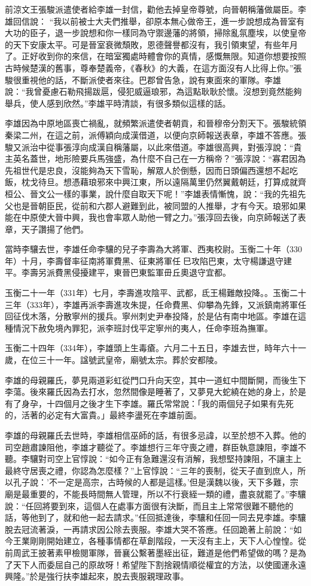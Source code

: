 前涼文王張駿派遣使者給李雄一封信，勸他去掉皇帝尊號，向晉朝稱藩做屬臣。李雄回信說： “我以前被士大夫們推舉，卻原本無心做帝王，進一步說想成為晉室有大功的臣子，退一步說想和你一樣同為守禦邊藩的將領，掃除亂氛塵埃，以使皇帝的天下安康太平。可是晉室衰微頹敗，恩德聲譽都沒有，我引領東望，有些年月了。正好收到你的來信，在暗室獨處時體會你的真情，感慨無限。知道你想要按照古時候楚漢的舊事，尊奉楚義帝，《春秋》的大義，在這方面沒有人比得上你。”張駿很重視他的話，不斷派使者來往。巴郡曾告急，說有東面來的軍隊。李雄說：“我曾憂慮石勒飛揚跋扈，侵犯威逼琅邪，為這點耿耿於懷。沒想到竟然能夠舉兵，使人感到欣然。”李雄平時清談，有很多類似這樣的話。

李雄因為中原地區喪亡禍亂，就頻繁派遣使者朝貢，和晉穆帝分割天下。張駿統領秦梁二州，在這之前，派傅穎向成漢借道，以便向京師報送表章，李雄不答應。張駿又派治中從事張淳向成漢自稱藩屬，以此來借道。李雄很高興，對張淳說：“貴主英名蓋世，地形險要兵馬強盛，為什麼不自己在一方稱帝？”張淳說：“寡君因為先祖世代是忠良，沒能夠為天下雪恥，解眾人於倒懸，因而日頭偏西還想不起吃飯，枕戈待旦。想憑藉琅邪來中興江東，所以遠隔萬里仍然翼戴朝廷，打算成就齊桓公、晉文公一樣的事業，說什麼自取天下呢！”李雄表情慚愧，說：“我的先祖先父也是晉朝臣民，從前和六郡人避難到此，被同盟的人推舉，才有今天。琅邪如果能在中原使大晉中興，我也會率眾人助他一臂之力。”張淳回去後，向京師報送了表章，天子讚揚了他們。

當時李驤去世，李雄任命李驤的兒子李壽為大將軍、西夷校尉。玉衡二十年（330年）十月，李壽督率征南將軍費黑、征東將軍任巳攻陷巴東，太守楊謙退守建平。李壽另派費黑侵擾建平，東晉巴東監軍毌丘奧退守宜都。

玉衡二十一年（331年）七月，李壽進攻陰平、武都，氐王楊難敵投降。。玉衡二十三年（333年），李雄再派李壽進攻朱提，任命費黑、仰攀為先鋒，又派鎮南將軍任回征伐木落，分散寧州的援兵。寧州刺史尹奉投降，於是佔有南中地區。李雄在這種情況下赦免境內罪犯，派李班討伐平定寧州的夷人，任命李班為撫軍。

玉衡二十四年（334年），李雄頭上生毒瘡。六月二十五日，李雄去世，時年六十一歲，在位三十一年。諡號武皇帝，廟號太宗。葬於安都陵。

李雄的母親羅氏，夢見兩道彩虹從門口升向天空，其中一道虹中間斷開，而後生下李蕩。後來羅氏因為去打水，忽然間像是睡著了，又夢見大蛇繞在她的身上，於是有了身孕，十四個月之後才生下李雄。羅氏常常說：「我的兩個兒子如果有先死的，活著的必定有大富貴。」最終李盪死在李雄前面。

李雄的母親羅氏去世時，李雄相信巫師的話，有很多忌諱，以至於想不入葬。他的司空趙肅諫阻他，李雄才聽從了。李雄想行三年守喪之禮，群臣執意諫阻，李雄不聽。李驤對司空上官惇說：“如今正有急難還沒有消解，我想堅持諫阻，不讓主上最終守居喪之禮，你認為怎麼樣？”上官惇說：“三年的喪制，從天子直到庶人，所以孔子說：'不一定是高宗，古時候的人都是這樣。'但是漢魏以後，天下多難，宗廟是最重要的，不能長時間無人管理，所以不行衰絰一類的禮，盡哀就罷了。”李驤說：“任回將要到來，這個人在處事方面很有決斷，而且主上常常很難不聽他的話，等他到了，就和他一起去請求。”任回抵達後，李驤和任回一同去見李雄。李驤脫去冠流著淚，一再請求因公除去喪服。李雄大哭不答應。任回跪著上前說：“如今王業剛剛開始建立，各種事情都在草創階段，一天沒有主上，天下人心惶惶。從前周武王披著素甲檢閱軍隊，晉襄公繫著墨絰出征，難道是他們希望做的嗎？是為了天下人而委屈自己的原故呀！希望陛下割捨親情順從權宜的方法，以使國運永遠興隆。”於是強行扶李雄起來，脫去喪服親理政事。


